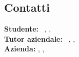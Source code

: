 \subsection{Contatti}
\textbf{Studente:} \nomeStudente\ \cognomeStudente, \href{mailto:\emailStudente}{\emailStudente}, \telStudente \\
\newline
\textbf{Tutor aziendale:} \nomeTutorAziendale\ \cognomeTutorAziendale, \href{mailto:\emailTutorAziendale}{\emailTutorAziendale}, \telTutorAziendale \\
\newline
\textbf{Azienda:} \ragioneSocAzienda, \indirizzoAzienda, \href{\sitoAzienda}{\sitoAzienda}
